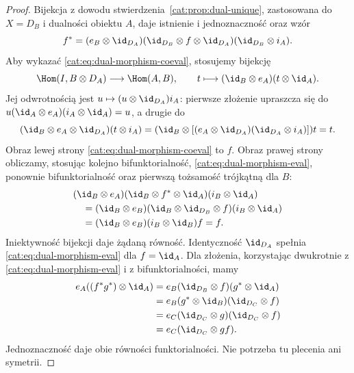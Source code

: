 \begin{proof}
Bijekcja z dowodu stwierdzenia~\ref{cat:prop:dual-unique}, zastosowana do $X=D_B$ i dualności obiektu $A$, daje istnienie i jednoznaczność oraz wzór
\[
f^*=(e_B\otimes\id_{D_A})(\id_{D_B}\otimes f\otimes\id_{D_A})(\id_{D_B}\otimes i_A).
\]
Aby wykazać \eqref{cat:eq:dual-morphism-coeval}, stosujemy bijekcję
\[
\Hom(I,B\otimes D_A)\longrightarrow\Hom(A,B),\qquad
t\longmapsto(\id_B\otimes e_A)(t\otimes\id_A).
\]
Jej odwrotnością jest $u\mapsto(u\otimes\id_{D_A})i_A$: pierwsze złożenie upraszcza się do $u(\id_A\otimes e_A)(i_A\otimes\id_A)=u$, a drugie do
\[
(\id_B\otimes e_A\otimes\id_{D_A})(t\otimes i_A)
=(\id_B\otimes[(e_A\otimes\id_{D_A})(\id_{D_A}\otimes i_A)])t=t.
\]
Obraz lewej strony \eqref{cat:eq:dual-morphism-coeval} to $f$. Obraz prawej strony obliczamy, stosując kolejno bifunktorialność, \eqref{cat:eq:dual-morphism-eval}, ponownie bifunktorialność oraz pierwszą tożsamość trójkątną dla $B$:
\[
\begin{aligned}
&(\id_B\otimes e_A)(\id_B\otimes f^*\otimes\id_A)(i_B\otimes\id_A)\\
&\quad=(\id_B\otimes e_B)(\id_B\otimes\id_{D_B}\otimes f)(i_B\otimes\id_A)\\
&\quad=(\id_B\otimes e_B)(i_B\otimes\id_B)f=f.
\end{aligned}
\]
Iniektywność bijekcji daje żądaną równość. Identyczność $\id_{D_A}$ spełnia \eqref{cat:eq:dual-morphism-eval} dla $f=\id_A$. Dla złożenia, korzystając dwukrotnie z \eqref{cat:eq:dual-morphism-eval} i z bifunktorialności, mamy
\[
\begin{aligned}
e_A((f^*g^*)\otimes\id_A)
&=e_B(\id_{D_B}\otimes f)(g^*\otimes\id_A)\\
&=e_B(g^*\otimes\id_B)(\id_{D_C}\otimes f)\\
&=e_C(\id_{D_C}\otimes g)(\id_{D_C}\otimes f)\\
&=e_C(\id_{D_C}\otimes gf).
\end{aligned}
\]
Jednoznaczność daje obie równości funktorialności. Nie potrzeba tu plecenia ani symetrii.
\end{proof}

